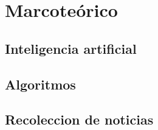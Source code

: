 \chapter{Marcoteórico}

\section{Inteligencia artificial}

\section{Algoritmos}


\section{Recoleccion de noticias}
